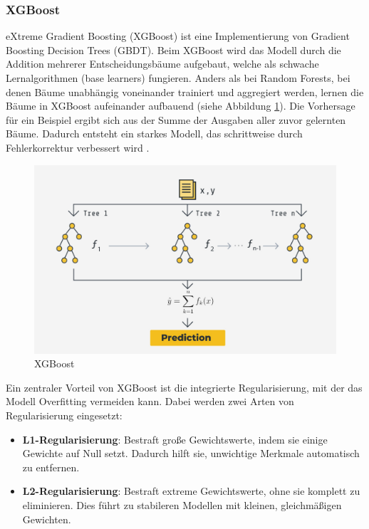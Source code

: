 \subsubsection{XGBoost}

eXtreme Gradient Boosting (XGBoost) ist eine Implementierung von Gradient Boosting Decision Trees (GBDT).
Beim XGBoost wird das Modell durch die Addition mehrerer Entscheidungsbäume aufgebaut, welche als
schwache Lernalgorithmen (base learners) fungieren. 
Anders als bei Random Forests, bei denen Bäume unabhängig voneinander trainiert und aggregiert werden, 
lernen die Bäume in XGBoost aufeinander aufbauend (siehe Abbildung \ref{fig:xgboost}). Die Vorhersage für ein Beispiel ergibt sich aus der Summe der 
Ausgaben aller zuvor gelernten Bäume. Dadurch entsteht ein starkes Modell, das schrittweise durch Fehlerkorrektur 
verbessert wird \cite{petrovic2024,chen2016xgboost,aslam2022}.

\begin{figure}[htbp]
    \begin{center}
        \includegraphics[scale=0.25]{static/xgboost-pipeline.jpg}
        \caption[XGBoost]{\label{fig:xgboost} XGBoost \cite{Gao2023FederatedXGBoost}}
    \end{center}
\end{figure}

Ein zentraler Vorteil von XGBoost ist die integrierte Regularisierung, mit der das Modell Overfitting vermeiden kann. 
Dabei werden zwei Arten von Regularisierung eingesetzt:

\begin{itemize}
    \item \textbf{L1-Regularisierung}: Bestraft große Gewichtswerte, indem sie einige Gewichte auf Null setzt. 
        Dadurch hilft sie, unwichtige Merkmale automatisch zu entfernen.
    \item \textbf{L2-Regularisierung}: Bestraft extreme Gewichtswerte, ohne sie komplett zu eliminieren. 
        Dies führt zu stabileren Modellen mit kleinen, gleichmäßigen Gewichten.
\end{itemize}

